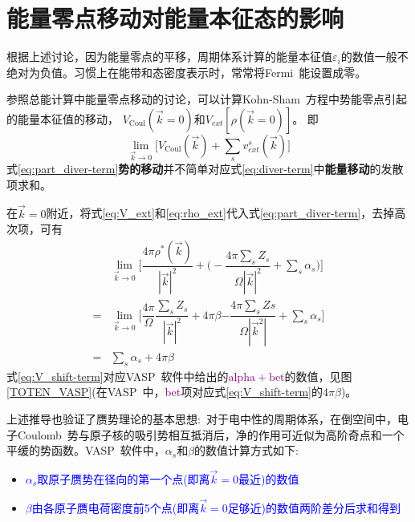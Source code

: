 \section{能量零点移动对能量本征态的影响}
根据上述讨论，因为能量零点的平移，周期体系计算的能量本征值$\varepsilon_i$的数值一般不绝对为负值。习惯上在能带和态密度表示时，常常将\textrm{Fermi~}能设置成零。

参照总能计算中能量零点移动的讨论，可以计算\textrm{Kohn-Sham~}方程中势能零点引起的能量本征值的移动，%
$V_{\mathrm{Coul}}(\vec k=0)$和$V_{ext}[\rho(\vec k=0)]$。
即
\begin{equation}
	\lim_{\vec k\rightarrow0}\bigg[V_{\mathrm{Coul}}(\vec k)+\sum_sv_{ext}^s(\vec k)\bigg]
	\label{eq:part_diver-term}
\end{equation}
式\eqref{eq:part_diver-term}\textbf{势的移动}并不简单对应式\eqref{eq:diver-term}中\textbf{能量移动}的发散项求和。

在$\vec k=0$附近，将式\eqref{eq:V_ext}和\eqref{eq:rho_ext}代入式\eqref{eq:part_diver-term}，去掉高次项，可有
\begin{equation}
	\begin{aligned}
		&\lim_{\vec k\rightarrow 0}\bigg[\dfrac{4\pi\rho^{\ast}(\vec k)}{|\vec k|^2}+\bigg(-\dfrac{4\pi\sum_sZ_s}{\Omega|\vec k|^2}+\sum_s\alpha_s\bigg)\bigg]\\
		=&\lim_{\vec k\rightarrow 0}\bigg[\boxed{\dfrac{4\pi}{\Omega}\dfrac{\sum_sZ_s}{|\vec k|^2}}+4\pi\beta\boxed{-\dfrac{4\pi\sum_sZs}{\Omega|\vec k^2|}}+\sum_s\alpha_s\bigg]\\
		=&\sum_s\alpha_s+4\pi\beta
	\end{aligned}
	\label{eq:V_shift-term}
\end{equation}
式\eqref{eq:V_shift-term}对应\textrm{VASP~}软件中给出的\textcolor{purple}{$\mathrm{alpha+bet}$}的数值，见图\ref{TOTEN_VASP}(在\textrm{VASP~}中，\textcolor{purple}{bet}项对应式\eqref{eq:V_shift-term}的$4\pi\beta$)。

上述推导也验证了赝势理论的基本思想:~对于电中性的周期体系，在倒空间中，电子\textrm{Coulomb~}势与原子核的吸引势相互抵消后，净的作用可近似为高阶奇点和一个平缓的势函数。\textrm{VASP~}软件中，$\alpha_s$和$\beta$的数值计算方式如下:~
\begin{itemize}
	\item \textcolor{blue}{$\alpha_s$取原子赝势在径向的第一个点(即离$\vec k=0$最近)的数值}
	\item \textcolor{blue}{$\beta$由各原子赝电荷密度前5个点(即离$\vec k=0$足够近)的数值两阶差分后求和得到}
\end{itemize}

